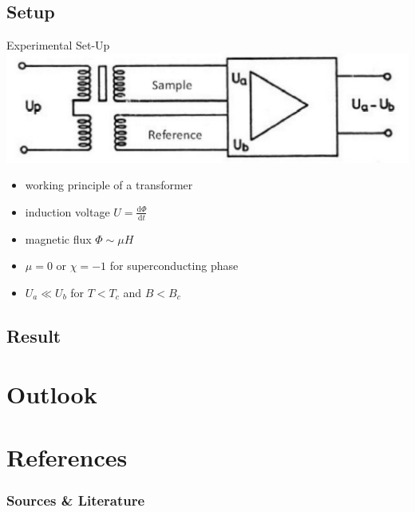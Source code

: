 \documentclass{beamer}
\begin{document}
\subsection{Setup} %
\begin{frame}{Experimental Set-Up}
\includegraphics[height=0.2\textheight]{img/detail.pdf}
\begin{itemize}[<+->]
\item working principle of a transformer
\item induction voltage $U = \frac{\mathrm{d}\Phi}{\mathrm d t} $
\item magnetic flux $\Phi \sim \mu H$
\item $\mu=0$ or $\chi=-1$ for superconducting phase
\item $U_a \ll U_b$ for $T<T_c$ and $B<B_c$
\end{itemize}



\end{frame}









\subsection{Result} %

\section{Outlook} %


\section[Sources]{References}
\begin{frame} \frametitle{Sources \& Literature}
\nocite{buckel}
\nocite{tinkham}
\nocite{BCS}
\nocite{GL}
\nocite{hofmann}


\end{frame}
\end{document}
